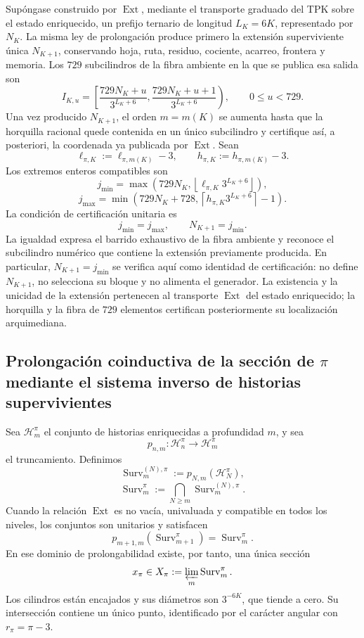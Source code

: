 Supóngase construido por \(\operatorname{Ext}\), mediante el transporte
graduado del TPK sobre el estado enriquecido, un prefijo ternario de longitud
\(L_K=6K\), representado por \(N_K\). La misma ley de prolongación produce
primero la extensión superviviente única \(N_{K+1}\), conservando hoja,
ruta, residuo, cociente, acarreo, frontera y memoria. Los \(729\)
subcilindros de la fibra ambiente en la que se publica esa salida son
\[
 I_{K,u}=
 \left[
 \frac{729N_K+u}{3^{L_K+6}},
 \frac{729N_K+u+1}{3^{L_K+6}}
 \right),
 \qquad0\leq u<729.
\]
Una vez producido \(N_{K+1}\), el orden \(m=m(K)\) se aumenta hasta que la
horquilla racional quede contenida en un único subcilindro y certifique así,
a posteriori, la coordenada ya publicada por \(\operatorname{Ext}\). Sean
\[
 \ell_{\pi,K}:=\ell_{\pi,m(K)}-3,
 \qquad
 h_{\pi,K}:=h_{\pi,m(K)}-3.
\]
Los extremos enteros compatibles son
\[
 j_{\min}=
 \max\!\left(
 729N_K,\left\lfloor
 \ell_{\pi,K}3^{L_K+6}\right\rfloor
 \right),
\]
\[
 j_{\max}=
 \min\!\left(
 729N_K+728,\left\lceil
 h_{\pi,K}3^{L_K+6}\right\rceil-1
 \right).
\]
La condición de certificación unitaria es
\begin{equation}
 \boxed{j_{\min}=j_{\max},\qquad N_{K+1}=j_{\min}.}
 \label{p12-83-c8-s1:eq:seleccion-unitaria-subcilindro-pi}
\end{equation}
La igualdad expresa el barrido exhaustivo de la fibra ambiente y reconoce el
subcilindro numérico que contiene la extensión previamente producida. En
particular, \(N_{K+1}=j_{\min}\) se verifica aquí como identidad de
certificación: no define \(N_{K+1}\), no selecciona su bloque y no alimenta el
generador. La existencia y la unicidad de la extensión pertenecen al
transporte \(\operatorname{Ext}\) del estado enriquecido; la horquilla y la
fibra de \(729\) elementos certifican posteriormente su localización
arquimediana.

\subsection{Prolongación coinductiva de la sección de \(\pi\) mediante el sistema inverso de historias supervivientes}

Sea \(\mathcal H_m^\pi\) el conjunto de historias enriquecidas a profundidad
\(m\), y sea
\[
 p_{n,m}:\mathcal H_n^\pi\longrightarrow\mathcal H_m^\pi
\]
el truncamiento. Definimos
\[
 \operatorname{Surv}_m^{(N),\pi}
 :=p_{N,m}(\mathcal H_N^\pi),
\]
\[
 \operatorname{Surv}_m^\pi
 :=\bigcap_{N\geq m}\operatorname{Surv}_m^{(N),\pi}.
\]
Cuando la relación \(\operatorname{Ext}\) es no vacía, univaluada y
compatible en todos los niveles, los conjuntos son unitarios y satisfacen
\[
 p_{m+1,m}(\operatorname{Surv}_{m+1}^{\pi})
 =\operatorname{Surv}_{m}^{\pi}.
\]
En ese dominio de prolongabilidad existe, por tanto, una única sección
\[
 x_\pi\in
 X_\pi:=\varprojlim_m\operatorname{Surv}_m^\pi.
\]
Los cilindros están encajados y sus diámetros son \(3^{-6K}\), que tiende a
cero. Su intersección contiene un único punto, identificado por el carácter
angular con \(r_\pi=\pi-3\).

